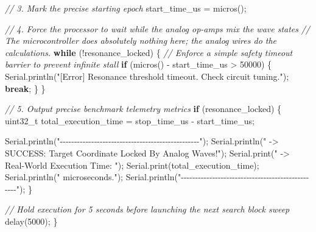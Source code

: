 \documentclass[
]{article}
\newenvironment{Shaded}{}{}
\newcommand{\CommentTok}[1]{\textcolor[rgb]{0.38,0.63,0.69}{\textit{#1}}}
\newcommand{\ControlFlowTok}[1]{\textcolor[rgb]{0.00,0.44,0.13}{\textbf{#1}}}
\newcommand{\DataTypeTok}[1]{\textcolor[rgb]{0.56,0.13,0.00}{#1}}
\newcommand{\DecValTok}[1]{\textcolor[rgb]{0.25,0.63,0.44}{#1}}
\newcommand{\NormalTok}[1]{#1}
\newcommand{\OperatorTok}[1]{\textcolor[rgb]{0.40,0.40,0.40}{#1}}
\newcommand{\StringTok}[1]{\textcolor[rgb]{0.25,0.44,0.63}{#1}}
\begin{document}
\begin{Shaded}
\begin{Highlighting}[]
    \CommentTok{// 3. Mark the precise starting epoch}
\NormalTok{    start\_time\_us }\OperatorTok{=}\NormalTok{ micros}\OperatorTok{();}

    \CommentTok{// 4. Force the processor to wait while the analog op{-}amps mix the wave states}
    \CommentTok{// The microcontroller does absolutely nothing here; the analog wires do the calculations.}
    \ControlFlowTok{while} \OperatorTok{(!}\NormalTok{resonance\_locked}\OperatorTok{)} \OperatorTok{\{}
        \CommentTok{// Enforce a simple safety timeout barrier to prevent infinite stall}
        \ControlFlowTok{if} \OperatorTok{(}\NormalTok{micros}\OperatorTok{()} \OperatorTok{{-}}\NormalTok{ start\_time\_us }\OperatorTok{\textgreater{}} \DecValTok{50000}\OperatorTok{)} \OperatorTok{\{} 
\NormalTok{            Serial}\OperatorTok{.}\NormalTok{println}\OperatorTok{(}\StringTok{"[Error] Resonance threshold timeout. Check circuit tuning."}\OperatorTok{);}
            \ControlFlowTok{break}\OperatorTok{;}
        \OperatorTok{\}}
    \OperatorTok{\}}

    \CommentTok{// 5. Output precise benchmark telemetry metrics}
    \ControlFlowTok{if} \OperatorTok{(}\NormalTok{resonance\_locked}\OperatorTok{)} \OperatorTok{\{}
        \DataTypeTok{uint32\_t}\NormalTok{ total\_execution\_time }\OperatorTok{=}\NormalTok{ stop\_time\_us }\OperatorTok{{-}}\NormalTok{ start\_time\_us}\OperatorTok{;}
        
\NormalTok{        Serial}\OperatorTok{.}\NormalTok{println}\OperatorTok{(}\StringTok{"{-}{-}{-}{-}{-}{-}{-}{-}{-}{-}{-}{-}{-}{-}{-}{-}{-}{-}{-}{-}{-}{-}{-}{-}{-}{-}{-}{-}{-}{-}{-}{-}{-}{-}{-}{-}{-}{-}{-}{-}{-}{-}{-}{-}{-}{-}{-}{-}{-}"}\OperatorTok{);}
\NormalTok{        Serial}\OperatorTok{.}\NormalTok{println}\OperatorTok{(}\StringTok{" {-}\textgreater{} SUCCESS: Target Coordinate Locked By Analog Waves!"}\OperatorTok{);}
\NormalTok{        Serial}\OperatorTok{.}\NormalTok{print}\OperatorTok{(}\StringTok{" {-}\textgreater{} Real{-}World Execution Time: "}\OperatorTok{);}
\NormalTok{        Serial}\OperatorTok{.}\NormalTok{print}\OperatorTok{(}\NormalTok{total\_execution\_time}\OperatorTok{);}
\NormalTok{        Serial}\OperatorTok{.}\NormalTok{println}\OperatorTok{(}\StringTok{" microseconds."}\OperatorTok{);}
\NormalTok{        Serial}\OperatorTok{.}\NormalTok{println}\OperatorTok{(}\StringTok{"{-}{-}{-}{-}{-}{-}{-}{-}{-}{-}{-}{-}{-}{-}{-}{-}{-}{-}{-}{-}{-}{-}{-}{-}{-}{-}{-}{-}{-}{-}{-}{-}{-}{-}{-}{-}{-}{-}{-}{-}{-}{-}{-}{-}{-}{-}{-}{-}{-}"}\OperatorTok{);}
    \OperatorTok{\}}

    \CommentTok{// Hold execution for 5 seconds before launching the next search block sweep}
\NormalTok{    delay}\OperatorTok{(}\DecValTok{5000}\OperatorTok{);}
\OperatorTok{\}}
\end{Highlighting}
\end{Shaded}
\end{document}

